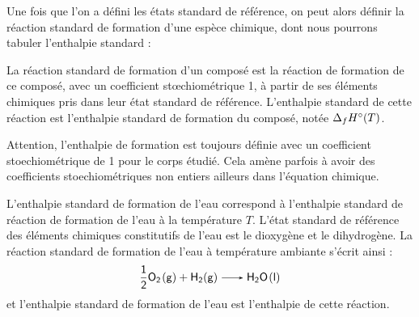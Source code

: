 \documentclass[11pt,fleqn]{book} %
\begin{document}
Une fois que l'on a défini les états standard de référence, on peut alors définir la réaction standard de formation d'une espèce chimique, dont nous pourrons tabuler l'enthalpie standard :
\begin{definition}
    La réaction standard de formation d’un composé est la réaction de formation de ce composé, avec un coefficient stœchiométrique 1, à partir de ses éléments chimiques pris dans leur état standard de référence. L’enthalpie standard de cette réaction est l’enthalpie standard de formation du composé, notée $\Delta_f H\degree(T)$.
\end{definition}
\begin{remark}
    Attention, l'enthalpie de formation est toujours définie avec un coefficient stoechiométrique de 1 pour le corps étudié. Cela amène parfois à avoir des coefficients stoechiométriques non entiers ailleurs dans l'équation chimique.
\end{remark}
\begin{example}
    L'enthalpie standard de formation de l'eau  correspond à l'enthalpie standard de réaction de formation de l'eau à la température $T$. L'état standard de référence des éléments chimiques constitutifs de l'eau est le dioxygène et le dihydrogène. La réaction standard de formation de l'eau à température ambiante s'écrit ainsi :
    \begin{equation}
        \ce{\frac{1}{2}O2(g) + H2(g) -> H2O(l)}
    \end{equation}
    et l'enthalpie standard de formation de l'eau est l'enthalpie de cette réaction.
\end{example}
\end{document}
